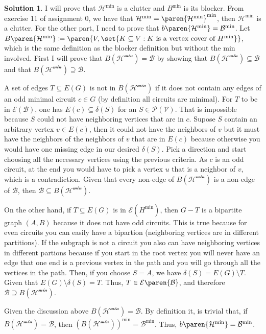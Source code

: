 \documentclass[11pt,leqno,final]{amsart}
\theoremstyle{definition}
\newtheorem{solution}{Solution}
\begin{document}
\begin{solution}
  I will prove that $\mathcal{H}^{\text{min}}$ is a clutter  and $B^{\text{min}}$ is its blocker. From exercise 11 of assignment 0, we have that $\mathcal{H}^{\text{min}} = \paren{\mathcal{H}^{\text{min}}}^{\text{min}}$, then $\mathcal{H}^{\text{min}}$ is a clutter. For the other part, I need to prove that $b\paren{\mathcal{H}^{\text{min}}} = \mathcal{B}^{\text{min}}$. Let $B\paren{\mathcal{H}^{\text{min}}} \coloneqq \paren{V, \set{K \subseteq V: K \text{ is a vertex cover of } H^{\text{min}}}}$, which is the same definition as the blocker definition but without the min involved. First I will prove that $B(\mathcal{H^{\text{min}}}) = \mathcal{B}$ by showing that $B(\mathcal{H^{\text{min}}}) \subseteq \mathcal{B}$ and that $B(\mathcal{H^{\text{min}}}) \supseteq \mathcal{B}$.
  
  A set of edges $T \subseteq E(G)$ is not in $B(\mathcal{H^{\text{min}}})$ if it does not contain any edges of an odd minimal circuit $c \in G$ (by definition all circuits are minimal). For $T$ to be in $\mathcal{E}(\mathcal{B})$, one has $E(c) \subseteq \delta(S)$ for an $S \in \mathcal{P(V)}$. That is impossible because $S$ could not have neighboring vertices that are in $c$. Supose $S$ contain an arbitrary vertex $v \in E(c)$, then it could not have the neighbors of $v$ but it must have the neighbors of the neighbors of $v$ that are in $E(c)$ because otherwise you would have one missing edge in our desired $\delta(S)$. Pick a direction and start choosing all the necessary vertices using the previous criteria. As $c$ is an odd circuit, at the end you would have to pick a vertex $u$ that is a neighbor of $v$, which is a contradiction. Given that every non-edge of $B(\mathcal{H^{\text{min}}})$ is a non-edge of $\mathcal{B}$, then $\mathcal{B} \subseteq B(\mathcal{H^{\text{min}}})$.  

  On the other hand, if $T \subseteq E(G)$ is in $\mathcal{E}(H^{\text{min}})$, then $G-T$ is a bipartite graph $(A,B)$ because it does not have odd circuits. This is true because for even circuits you can easily have a bipartion (neighboring vertices are in different partitions). If the subgraph is not a circuit you also can have neighboring vertices in different partions because if you start in the root vertex you will never have an edge that one end is a previous vertex in the path and you will go through all the vertices in the path. Then, if you choose $S = A$, we have  $\delta(S) = E(G) \setminus T$. Given that $E(G) \setminus \delta(S) = T$. Thus, $T \in \mathcal{E}\paren{\mathcal{B}}$, and therefore $\mathcal{B} \supseteq B(\mathcal{H^{\text{min}}})$.
  
  Given the discussion above $B(\mathcal{H^{\text{min}}}) = \mathcal{B}$. By definition it, is trivial that, if $B(\mathcal{H^{\text{min}}}) = \mathcal{B}$, then $(B(\mathcal{H^{\text{min}}}))^{\text{min}} = \mathcal{B}^{\text{min}}$. Thus, $b\paren{\mathcal{H}^{\text{min}}} = \mathcal{B}^{\text{min}}$.
\end{solution}
\end{document}
